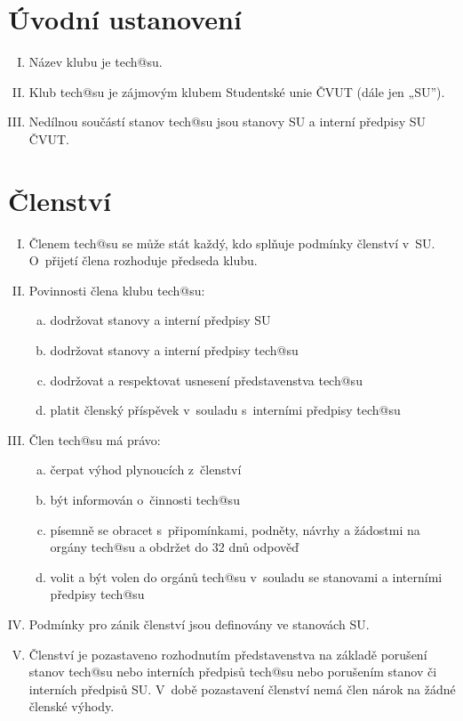 \documentclass[10pt]{article}
\begin{document}
\section{Úvodní ustanovení} %
	\begin{enumerate}[I.]
	\item Název klubu je tech@su.
	\item Klub tech@su je zájmovým klubem Studentské unie ČVUT (dále jen „SU”).  
	\item Nedílnou součástí stanov tech@su jsou stanovy SU a interní předpisy SU ČVUT.
	\end{enumerate}

\section{Členství} %
	\begin{enumerate}[I.]
	\item Členem tech@su se může stát každý, kdo splňuje podmínky členství v~SU. O~přijetí člena rozhoduje předseda klubu.
	\item Povinnosti člena klubu tech@su: 
		\begin{enumerate}[a.]
		\item dodržovat stanovy a interní předpisy SU
		\item dodržovat stanovy a interní předpisy tech@su
		\item dodržovat a respektovat usnesení představenstva tech@su
		\item platit členský příspěvek v~souladu s~interními předpisy tech@su
		\end{enumerate}
	\item Člen tech@su má právo:
		\begin{enumerate}[a.]
		\item čerpat výhod plynoucích z~členství
		\item být informován o~činnosti tech@su 
		\item písemně se obracet s~připomínkami, podněty, návrhy a žádostmi na orgány tech@su a obdržet do 32 dnů odpověď
		\item volit a být volen do orgánů tech@su v~souladu se stanovami a interními předpisy tech@su
		\end{enumerate}
	\item Podmínky pro zánik členství jsou definovány ve stanovách SU.  
	\item Členství je pozastaveno rozhodnutím představenstva na základě porušení stanov tech@su nebo interních předpisů tech@su nebo porušením stanov či interních předpisů SU. V~době pozastavení členství nemá člen nárok na žádné členské výhody.     
	\end{enumerate}
\end{document}
